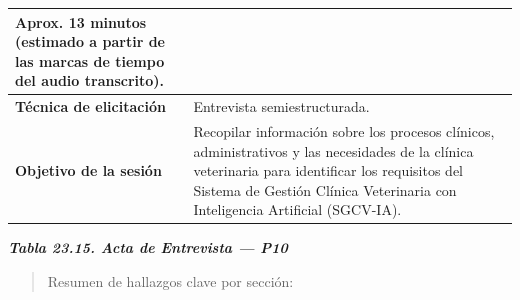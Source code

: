 \documentclass[
]{article}
\begin{document}
{\begin{longtable}[]{|
  >{\raggedright\arraybackslash}p{}|
  >{\raggedright\arraybackslash}p{}|}
\begin{minipage}[t]{\linewidth}
Aprox. 13 minutos (estimado a partir de las marcas de tiempo del audio transcrito).
\end{minipage} \\
\hline
\textbf{Técnica de elicitación} & \begin{minipage}[t]{\linewidth}\raggedright
Entrevista semiestructurada.
\end{minipage} \\
\hline
\textbf{Objetivo de la sesión} & \begin{minipage}[t]{\linewidth}\raggedright
Recopilar información sobre los procesos clínicos, administrativos y las necesidades de la clínica veterinaria para identificar los requisitos del Sistema de Gestión Clínica Veterinaria con Inteligencia Artificial (SGCV-IA).
\end{minipage} \\
\hline
\end{longtable}
}

\protect{}\label{_bookmark_P10_acta}{}\emph{\textbf{Tabla 23.15. Acta de Entrevista --- P10}}

\begin{quote}
Resumen de hallazgos clave por sección:
\end{quote}
\end{document}

